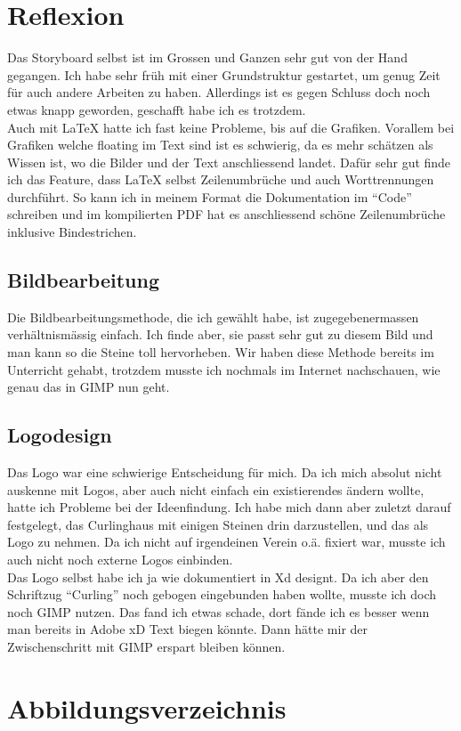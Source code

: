 \documentclass[11pt]{article}
\begin{document}
    \section{Reflexion}
    Das Storyboard selbst ist im Grossen und Ganzen sehr gut von der Hand gegangen. Ich habe sehr früh mit einer
    Grundstruktur gestartet, um genug Zeit für auch andere Arbeiten zu haben. Allerdings ist es gegen Schluss doch
    noch etwas knapp geworden, geschafft habe ich es trotzdem. \smiley
    \\Auch mit \LaTeX\xspace hatte ich fast keine Probleme, bis auf die Grafiken. Vorallem bei Grafiken welche floating
    im Text sind ist es schwierig, da es mehr schätzen als Wissen ist, wo die Bilder und der Text anschliessend
    landet. Dafür sehr gut finde ich das Feature, dass \LaTeX\xspace selbst Zeilenumbrüche und auch Worttrennungen
    durchführt. So kann ich in meinem Format die Dokumentation im ``Code'' schreiben und im kompilierten PDF hat es
    anschliessend schöne Zeilenumbrüche inklusive Bindestrichen.

    \subsection{Bildbearbeitung}
    Die Bildbearbeitungsmethode, die ich gewählt habe, ist zugegebenermassen verhältnismässig einfach. Ich finde aber,
    sie passt sehr gut zu diesem Bild und man kann so die Steine toll hervorheben. Wir haben diese Methode bereits im
    Unterricht gehabt, trotzdem musste ich nochmals im Internet nachschauen, wie genau das in GIMP nun geht.

    \subsection{Logodesign}
    Das Logo war eine schwierige Entscheidung für mich. Da ich mich absolut nicht auskenne mit Logos, aber auch nicht
    einfach ein existierendes ändern wollte, hatte ich Probleme bei der Ideenfindung. Ich habe mich dann aber zuletzt
    darauf festgelegt, das Curlinghaus mit einigen Steinen drin darzustellen, und das als Logo zu nehmen. Da ich nicht
    auf irgendeinen Verein o.ä. fixiert war, musste ich auch nicht noch externe Logos einbinden.
    \\Das Logo selbst habe ich ja wie dokumentiert in Xd designt. Da ich aber den Schriftzug ``Curling'' noch gebogen
    eingebunden haben wollte, musste ich doch noch GIMP nutzen. Das fand ich etwas schade, dort fände ich es besser
    wenn man bereits in Adobe xD Text biegen könnte. Dann hätte mir der Zwischenschritt mit GIMP erspart bleiben können.

    \pagebreak
    \section{Abbildungsverzeichnis}
    \begin{appendix}
        \listoffigures
    \end{appendix}
\end{document}
